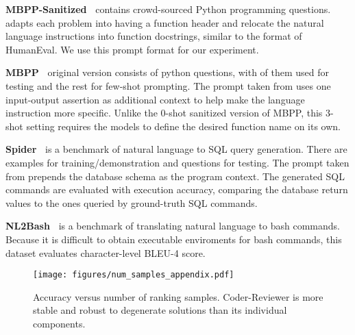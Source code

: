 \documentclass[nohyperref]{article}
\theoremstyle{plain}
\theoremstyle{definition}
\theoremstyle{remark}
\renewcommand{\paragraph}[1]{
     \textbf{#1} 
 }
\begin{document}
\paragraph{MBPP-Sanitized~\citep{mbpp}} contains  crowd-sourced Python programming questions. \citet{codet} adapts each problem into having a function header and relocate the natural language instructions into function docstrings, similar to the format of HumanEval. We use this prompt format for our experiment.


\paragraph{MBPP~\citep{mbpp}} original version consists of  python questions, with  of them used for testing and the rest for few-shot prompting.
The prompt taken from \citet{mbr} uses one input-output assertion as additional context to help make the language instruction more specific.
Unlike the 0-shot sanitized version of MBPP, this 3-shot setting requires the models to define the desired function name on its own.

\paragraph{Spider~\citep{spider}} is a benchmark of natural language to SQL query generation.
There are  examples for training/demonstration and  questions for testing.
The prompt taken from \citet{mbr} prepends the database schema as the program context.
The generated SQL commands are evaluated with execution accuracy, comparing the database return values to the ones queried by ground-truth SQL commands.

\paragraph{NL2Bash~\citep{nl2bash}} is a benchmark of translating natural language to bash commands.
Because it is difficult to obtain executable enviroments for bash commands, this dataset evaluates character-level BLEU-4 score.
 
\begin{figure*}[ht!]
     \centering
     \texttt{[image: figures/num\_samples\_appendix.pdf]}
     \caption{Accuracy versus number of ranking samples. Coder-Reviewer is more stable and robust to degenerate solutions than its individual components.}
     \label{fig:num_examples_appendix}
     \vspace{-5pt}
\end{figure*}
\end{document}
